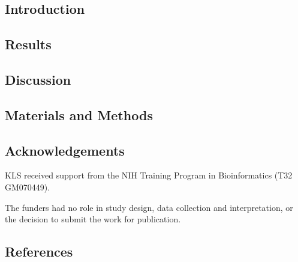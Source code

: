 \documentclass[
  12pt,
]{article}
\begin{document}
\newpage

\hypertarget{introduction}{%
\subsection{Introduction}\label{introduction}}

\hypertarget{results}{%
\subsection{Results}\label{results}}

\hypertarget{discussion}{%
\subsection{Discussion}\label{discussion}}

\hypertarget{materials-and-methods}{%
\subsection{Materials and Methods}\label{materials-and-methods}}

\hypertarget{acknowledgements}{%
\subsection{Acknowledgements}\label{acknowledgements}}

KLS received support from the NIH Training Program in Bioinformatics
(T32 GM070449).

The funders had no role in study design, data collection and
interpretation, or the decision to submit the work for publication.

\hypertarget{references}{%
\subsection*{References}\label{references}}
\end{document}
